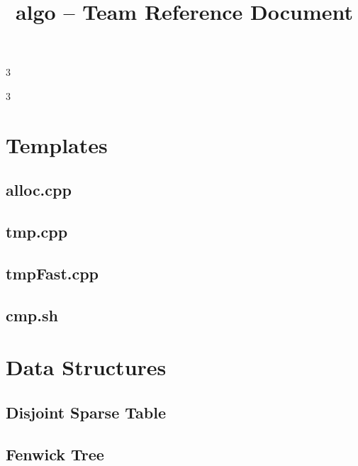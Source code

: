 \documentclass[8pt,a4paper,landscape,twoside]{extarticle}
\begin{document}
\title{\bfseries algo -- Team Reference Document}
\author{}
\date{}
\maketitle

\begin{multicols*}{3}
\tableofcontents
\end{multicols*}

\pagebreak
\begin{multicols*}{3}
\raggedcolumns

\section{Templates}

\subsection{alloc.cpp}


\subsection{tmp.cpp}


\subsection{tmpFast.cpp}


\subsection{cmp.sh}


\section{Data Structures}

\subsection{Disjoint Sparse Table}


\subsection{Fenwick Tree}



\end{multicols*}
\end{document}
